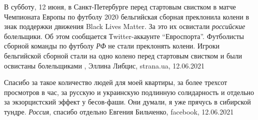 В субботу, 12 июня, в Санкт-Петербурге перед стартовым свистком в матче
Чемпионата Европы по футболу 2020 бельгийская сборная преклонила колени в знак
поддержки движения Black Lives Matter. За это их освистали \emph{российские}
болельщики. Об этом сообщается Тwitter-аккаунте \enquote{Евроспорта}.
Футболисты сборной команды по футболу \emph{РФ} не стали преклонять колени.
Игроки бельгийской сборной стали на одно колено перед стартовым свистком и были
освистаны болельщиками
, 
Эллина Либцис, strana.ua, 12.06.2021

Спасибо за такое количество людей для моей квартиры, за более трехсот
просмотров в час, за русскую и украинскую подлинную солидарность и отдельно за
экзорцистский эффект у бесов-фаши. Они думали, я уже прячусь в сибирской
тундре. \emph{Россия}, спасибо отдельно
Евгения Бильченко, facebook, 12.06.2021
